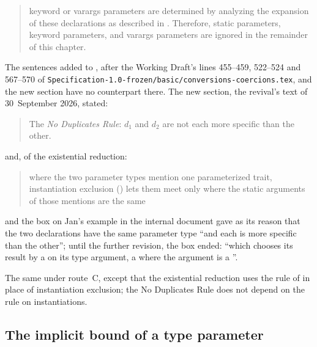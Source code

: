 \begin{description}
\begin{quote}
keyword or varargs parameters are determined by analyzing the expansion of these
declarations as described in .
Therefore, static parameters, keyword parameters, and varargs parameters are
ignored in the remainder of this chapter.
\end{quote}
The sentences added to , after the Working Draft's
lines 455--459, 522--524 and 567--570 of
\nolinkurl{Specification-1.0-frozen/basic/conversions-coercions.tex}, and the new
section have no counterpart there.
The new section, the revival's text of 30~September 2026, stated:
\begin{quote}
The \emph{No Duplicates Rule}: $d_1$ and $d_2$ are not each more specific than
the other.
\end{quote}
and, of the existential reduction:
\begin{quote}
where the two parameter types mention one parameterized trait, instantiation
exclusion () lets them meet only where the static arguments
of those mentions are the same
\end{quote}
and the box on Jan's example in the internal document gave as its reason that
the two declarations have the same parameter type ``and each is more specific
than the other''; until the further revision, the box ended: ``which chooses its
result by a  on its type argument, a  where the
argument is a ''.
\item[Route C] The same under route~C, except that the existential reduction
uses the rule of  in place of instantiation exclusion;
the No Duplicates Rule does not depend on the rule on instantiations.
\end{description}

\subsection{The implicit bound of a type parameter}

